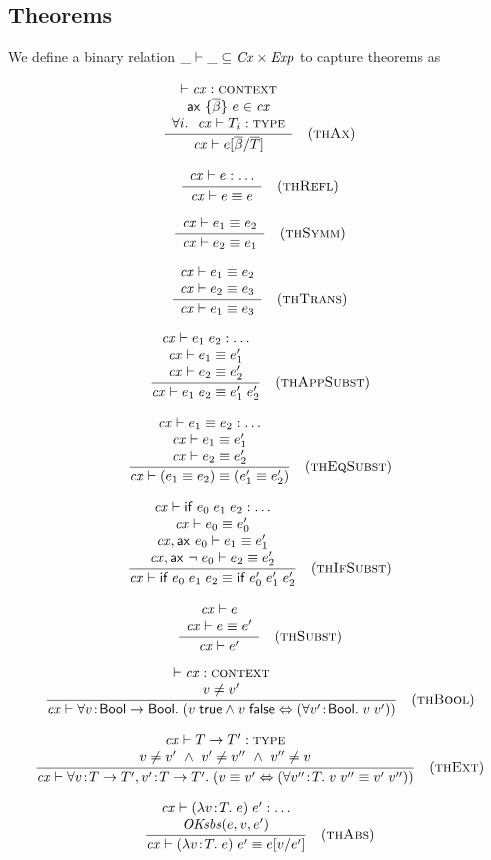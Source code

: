 \subsection{Theorems}

We define a binary relation $\_\vdash\_\subseteq\mathit{Cx}\times\mathit{Exp}$ to capture theorems as

\[
\frac{\begin{array}{c}\vdash\mathit{cx}:\textsc{context}\\\mathsf{ax}\ \{\overline{\beta}\}\ e\in\mathit{cx}\\\forall i.\ \ \mathit{cx}\vdash T_i:\textsc{type}\end{array}}{\mathit{cx}\vdash e[\overline{\beta}/\overline{T}]}\quad\mbox{(\textsc{thAx})}
\]

\[
\frac{\begin{array}{c}\mathit{cx}\vdash e:\ldots\end{array}}{\mathit{cx}\vdash e\equiv e}\quad\mbox{(\textsc{thRefl})}
\]

\[
\frac{\begin{array}{c}\mathit{cx}\vdash e_1\equiv e_2\end{array}}{\mathit{cx}\vdash e_2\equiv e_1}\quad\mbox{(\textsc{thSymm})}
\]

\[
\frac{\begin{array}{c}\mathit{cx}\vdash e_1\equiv e_2\\\mathit{cx}\vdash e_2\equiv e_3\end{array}}{\mathit{cx}\vdash e_1\equiv e_3}\quad\mbox{(\textsc{thTrans})}
\]

\[
\frac{\begin{array}{c}\mathit{cx}\vdash e_1\;e_2:\ldots\\\mathit{cx}\vdash e_1\equiv e_1'\\\mathit{cx}\vdash e_2\equiv e_2'\end{array}}{\mathit{cx}\vdash e_1\;e_2\equiv e_1'\;e_2'}\quad\mbox{(\textsc{thAppSubst})}
\]

\[
\frac{\begin{array}{c}\mathit{cx}\vdash e_1\equiv e_2:\ldots\\\mathit{cx}\vdash e_1\equiv e_1'\\\mathit{cx}\vdash e_2\equiv e_2'\end{array}}{\mathit{cx}\vdash(e_1\equiv e_2)\equiv(e_1'\equiv e_2')}\quad\mbox{(\textsc{thEqSubst})}
\]

\[
\frac{\begin{array}{c}\mathit{cx}\vdash\mathsf{if}\;e_0\;e_1\;e_2:\ldots\\\mathit{cx}\vdash e_0\equiv e_0'\\\mathit{cx},\mathsf{ax}\ e_0\vdash e_1\equiv e_1'\\\mathit{cx},\mathsf{ax}\ \lnot\;e_0\vdash e_2\equiv e_2'\end{array}}{\mathit{cx}\vdash\mathsf{if}\;e_0\;e_1\;e_2\equiv\mathsf{if}\;e_0'\;e_1'\;e_2'}\quad\mbox{(\textsc{thIfSubst})}
\]

\[
\frac{\begin{array}{c}\mathit{cx}\vdash e\\\mathit{cx}\vdash e\equiv e'\end{array}}{\mathit{cx}\vdash e'}\quad\mbox{(\textsc{thSubst})}
\]

\[
\frac{\begin{array}{c}\vdash\mathit{cx}:\textsc{context}\\v\neq v'\end{array}}{\mathit{cx}\vdash\forall v\!:\!\mathsf{Bool}\to\mathsf{Bool}.\;(v\;\mathsf{true}\land v\;\mathsf{false}\Leftrightarrow(\forall v'\!:\!\mathsf{Bool}.\;v\;v'))}\quad\mbox{(\textsc{thBool})}
\]

\[
\frac{\begin{array}{c}\mathit{cx}\vdash T\to T':\textsc{type}\\v\neq v'\ \wedge\ v'\neq v''\ \wedge\ v''\neq v\end{array}}{\mathit{cx}\vdash\forall v\!:\!T\to T',v'\!:\!T\to T'.\;(v\equiv v'\Leftrightarrow(\forall v''\!:\!T.\;v\;v''\equiv v'\;v''))}\quad\mbox{(\textsc{thExt})}
\]

\[
\frac{\begin{array}{c}\mathit{cx}\vdash(\lambda v\!:\!T.\;e)\;e':\ldots\\\mathit{OKsbs}(e,v,e')\end{array}}{\mathit{cx}\vdash(\lambda v\!:\!T.\;e)\;e'\equiv e[v/e']}\quad\mbox{(\textsc{thAbs})}
\]

